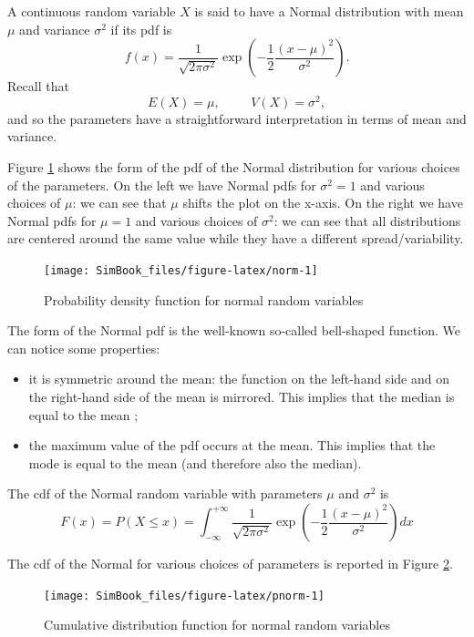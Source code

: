 \documentclass[
]{book}
\begin{document}
A continuous random variable \(X\) is said to have a Normal distribution with mean \(\mu\) and variance \(\sigma^2\) if its pdf is
\[
f(x) = \frac{1}{\sqrt{2\pi\sigma^2}}\exp\left(-\frac{1}{2}\frac{(x-\mu)^2}{\sigma^2}\right).
\]
Recall that
\[
E(X)=\mu, \hspace{1cm} V(X)=\sigma^2,
\]
and so the parameters have a straightforward interpretation in terms of mean and variance.

Figure \ref{fig:norm} shows the form of the pdf of the Normal distribution for various choices of the parameters. On the left we have Normal pdfs for \(\sigma^2=1\) and various choices of \(\mu\): we can see that \(\mu\) shifts the plot on the x-axis. On the right we have Normal pdfs for \(\mu=1\) and various choices of \(\sigma^2\): we can see that all distributions are centered around the same value while they have a different spread/variability.

\begin{figure}

{\centering \texttt{[image: SimBook\_files/figure-latex/norm-1]} 

}

\caption{Probability density function for normal random variables}\label{fig:norm}
\end{figure}

The form of the Normal pdf is the well-known so-called bell-shaped function. We can notice some properties:

\begin{itemize}
\item
  it is symmetric around the mean: the function on the left-hand side and on the right-hand side of the mean is mirrored. This implies that the median is equal to the mean ;
\item
  the maximum value of the pdf occurs at the mean. This implies that the mode is equal to the mean (and therefore also the median).
\end{itemize}

The cdf of the Normal random variable with parameters \(\mu\) and \(\sigma^2\) is
\[
F(x) = P(X\leq x)=\int_{-\infty}^{+\infty}\frac{1}{\sqrt{2\pi\sigma^2}}\exp\left(-\frac{1}{2}\frac{(x-\mu)^2}{\sigma^2}\right)dx
\]

The cdf of the Normal for various choices of parameters is reported in Figure \ref{fig:pnorm}.

\begin{figure}

{\centering \texttt{[image: SimBook\_files/figure-latex/pnorm-1]} 

}

\caption{Cumulative distribution function for normal random variables}\label{fig:pnorm}
\end{figure}
\end{document}
